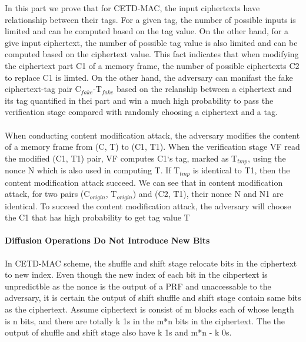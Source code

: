 \documentclass{article}
\begin{document}
In this part we prove that for CETD-MAC, the input ciphertexts have relationship between their tags.  For a given tag, the number of possible inputs is limited and can be computed based on the tag value. On the other hand, for a give input ciphertext, the number of possible tag value is also limited and can be computed based on the ciphertext value. This fact indicates that when modifying the ciphertext part C1 of a memory frame, the number of possible ciphertexts C2 to replace C1 is limted. On the other hand, the adversary can manifast the fake ciphertext-tag pair C$_{fake}$-T$_{fake}$ based on the relanship between a ciphertext and its tag quantified in thei part and win a much high probability to pass the verification stage compared with randomly choosing a ciphertext and a tag. 

\paragraph{ }
When conducting content modification attack, the adversary modifies the content of a memory frame from (C, T) to (C1, T1). When the verification stage VF read the modified (C1, T1) pair, VF computes C1`s tag, marked as T$_{tmp}$, using the nonce N which is also used in computing T. If T$_{tmp}$ is identical to T1, then the content modification attack succeed. We can see that in content modification attack, for two pairs (C$_{origin}$, T$_{origin}$) and (C2, T1), their nonce N and N1 are identical. To succeed the content modification attack, the adversary will choose the C1 that has high probability to get tag value T    
\paragraph{Diffusion Operations Do Not Introduce New Bits}
In CETD-MAC scheme, the shuffle and shift stage relocate bits in the ciphertext to new index. Even though the new index of each bit in the cihpertext is unpredictble as the nonce is the output of a PRF and unaccessable to the adversary, it is certain the output of shift shuffle and shift stage contain same bits as the ciphertext. Assume ciphertext is consist of m blocks each of whose length is n bits, and there are totally k 1s in the m*n bits in the ciphertext. The the output of shuffle and shift stage also have k 1s and m*n - k 0s. 
\end{document}

